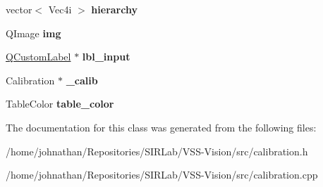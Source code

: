 \begin{DoxyCompactItemize}
\item 
vector$<$ Vec4i $>$ {\bfseries hierarchy}\hypertarget{classcalibration_a818940843ae109ee2e7bd3cb202c4704}{}\label{classcalibration_a818940843ae109ee2e7bd3cb202c4704}

\item 
Q\+Image {\bfseries img}\hypertarget{classcalibration_abb31447445117b52af6865628355a76a}{}\label{classcalibration_abb31447445117b52af6865628355a76a}

\item 
\hyperlink{classQCustomLabel}{Q\+Custom\+Label} $\ast$ {\bfseries lbl\+\_\+input}\hypertarget{classcalibration_ade63c6e2fc49e68c15514133f30cbc65}{}\label{classcalibration_ade63c6e2fc49e68c15514133f30cbc65}

\item 
Calibration $\ast$ {\bfseries \+\_\+calib}\hypertarget{classcalibration_ad523b82addd861c31202b3d0d152f848}{}\label{classcalibration_ad523b82addd861c31202b3d0d152f848}

\item 
Table\+Color {\bfseries table\+\_\+color}\hypertarget{classcalibration_a941d98916460576b4bb2bfe9dd7c8f85}{}\label{classcalibration_a941d98916460576b4bb2bfe9dd7c8f85}

\end{DoxyCompactItemize}


The documentation for this class was generated from the following files\+:\begin{DoxyCompactItemize}
\item 
/home/johnathan/\+Repositories/\+S\+I\+R\+Lab/\+V\+S\+S-\/\+Vision/src/calibration.\+h\item 
/home/johnathan/\+Repositories/\+S\+I\+R\+Lab/\+V\+S\+S-\/\+Vision/src/calibration.\+cpp\end{DoxyCompactItemize}

